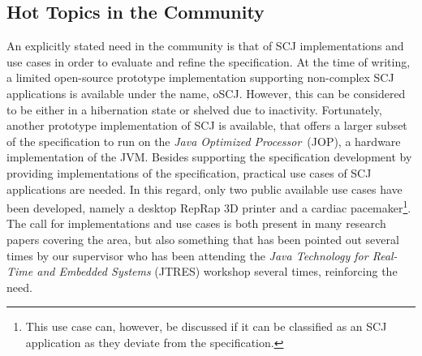 

\subsection{Hot Topics in the Community} %
\label{sub:interestingresearch}
An explicitly stated need in the community is that of SCJ implementations and use cases\cite{Schoeberl:2012:SCJonJava} in order to evaluate and refine the specification.
At the time of writing, a limited open-source prototype implementation supporting non-complex SCJ applications is available under the name, oSCJ\cite{oSCJ}. However, this can be considered to be either in a hibernation state or shelved due to inactivity. Fortunately, another prototype implementation of SCJ is available, that offers a larger subset of the specification to run on the \textit{Java Optimized Processor}~(JOP), a hardware implementation of the JVM\cite{Schoeberl:2012:SCJonJava}. Besides supporting the specification development by providing implementations of the specification, practical use cases of SCJ applications are needed. In this regard, only two public available use cases have been developed, namely a desktop RepRap 3D printer\cite{Schoeberl:2012:RepRap} and a cardiac pacemaker\cite{Singh:2012:CPC:2388936.2388948}\footnote{This use case can, however, be discussed if it can be classified as an SCJ application as they deviate from the specification.}. The call for implementations and use cases is both present in many research papers covering the area, but also something that has been pointed out several times by our supervisor who has been attending the \textit{Java Technology for Real-Time and Embedded Systems} (JTRES) workshop several times, reinforcing the need.

